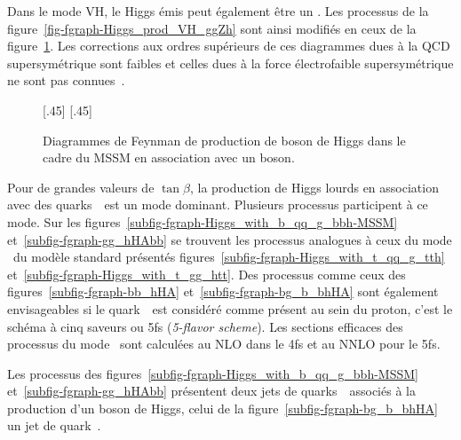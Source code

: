 \par Dans le mode VH, le Higgs émis peut également être un \Higgs.
Les processus de la figure~\ref{fig-fgraph-Higgs_prod_VH_ggZh} sont ainsi modifiés en ceux de la figure~\ref{fig-fgraph-Higgs_prod_VH_ggZh-MSSM}.
Les corrections aux ordres supérieurs de ces diagrammes dues à la QCD supersymétrique sont faibles et celles dues à la force électrofaible supersymétrique ne sont pas connues~\cite{Higgs_xsec_book_1}.
\begin{figure}[h]
\centering
\vspace{\baselineskip}
[.45\textwidth]
{\vspace{\baselineskip}}
\hfill
{}[.45\textwidth]
{\vspace{\baselineskip}}
\caption[Production de boson de Higgs du MSSM en association avec un boson.]{Diagrammes de Feynman de production de boson de Higgs dans le cadre du MSSM en association avec un boson.}
\label{fig-fgraph-Higgs_prod_VH_ggZh-MSSM}
\end{figure}
\par Pour de grandes valeurs de $\tan\beta$, la production de Higgs lourds en association avec des quarks~\quarkb\ est un mode dominant.
Plusieurs processus participent à ce mode.
Sur les figures~\ref{subfig-fgraph-Higgs_with_b_qq_g_bbh-MSSM} et~\ref{subfig-fgraph-gg_hHAbb} se trouvent les processus analogues à ceux du mode \ttbar\higgs\ du modèle standard présentés figures~\ref{subfig-fgraph-Higgs_with_t_qq_g_tth} et~\ref{subfig-fgraph-Higgs_with_t_gg_htt}.
Des processus comme ceux des figures~\ref{subfig-fgraph-bb_hHA} et~\ref{subfig-fgraph-bg_b_bhHA} sont également envisageables si le quark~\quarkb\ est considéré comme présent au sein du proton, c'est le \og schéma à cinq saveurs \fg{} ou 5fs (\emph{5-flavor scheme}).
Les sections efficaces des processus du mode \quarkb\antiquarkb\higgs\ sont calculées au NLO dans le 4fs et au NNLO pour le 5fs.
\par Les processus des figures~\ref{subfig-fgraph-Higgs_with_b_qq_g_bbh-MSSM} et~\ref{subfig-fgraph-gg_hHAbb} présentent deux jets de quarks~\quarkb\ associés à la production d'un boson de Higgs, celui de la figure~\ref{subfig-fgraph-bg_b_bhHA} un jet de quark~\quarkb.
